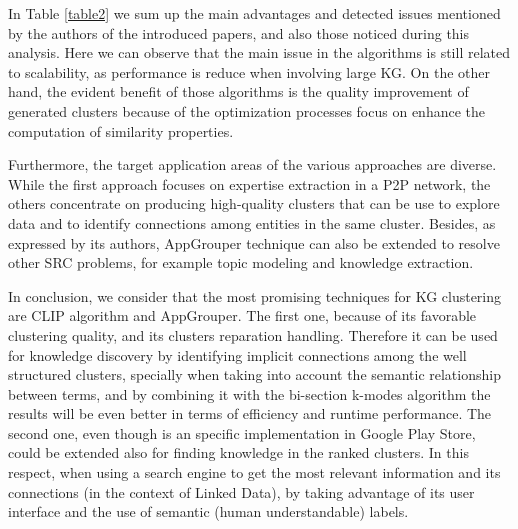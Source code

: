 \documentclass[runningheads]{llncs}
\begin{document}
\medskip In Table \ref{table2} we sum up the main advantages and detected issues mentioned by the authors of the introduced papers, and also those noticed during this analysis. Here we can observe that the main issue in the algorithms is still related to scalability, as performance is reduce when involving large KG. On the other hand, the evident benefit of those algorithms is the quality improvement of generated clusters because of the optimization processes focus on enhance the computation of similarity properties.

Furthermore, the target application areas of the various approaches are diverse. While the first approach focuses on expertise extraction in a P2P network, the others concentrate on producing high-quality clusters that can be use to explore data and to identify connections among entities in the same cluster. Besides, as expressed by its authors, AppGrouper technique can also be extended to resolve other SRC problems, for example topic modeling and knowledge extraction.

In conclusion, we consider that the most promising techniques for KG clustering are CLIP algorithm and AppGrouper. The first one, because of its favorable clustering quality, and its clusters reparation handling. Therefore it can be used for knowledge discovery by identifying implicit connections among the well structured clusters, specially when taking into account the semantic relationship between terms, and by combining it with the bi-section k-modes algorithm the results will be even better in terms of efficiency and runtime performance. The second one, even though is an specific implementation in Google Play Store, could be extended also for finding knowledge in the ranked clusters. In this respect, when using a search engine to get the most relevant information and its connections (in the context of Linked Data), by taking advantage of its user interface and the use of semantic (human understandable) labels.
\end{document}
